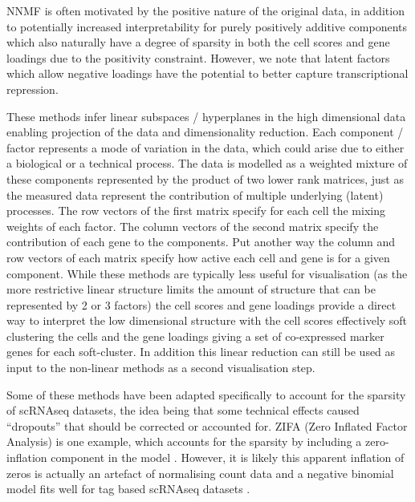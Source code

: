 
NNMF is often motivated by the positive nature of the original data, in addition to potentially increased interpretability for purely positively additive components which also naturally have a degree of sparsity in both the cell scores and gene loadings due to the positivity constraint. However, we note that latent factors which allow negative loadings have the potential to better capture transcriptional repression. 

These methods infer linear subspaces / hyperplanes in the high dimensional data enabling projection of the data and dimensionality reduction. Each component / factor represents a mode of variation in the data, which could arise due to either a biological or a technical process. The data is modelled as a weighted mixture of these components represented by the product of two lower rank matrices, just as the measured data represent the contribution of multiple underlying (latent) processes. The row vectors of the first matrix specify for each cell the mixing weights of each factor. The column vectors of the second matrix specify the contribution of each gene to the components. Put another way the column and row vectors of each matrix specify how active each cell and gene is for a given component. While these methods are typically less useful for visualisation (as the more restrictive linear structure limits the amount of structure that can be represented by 2 or 3 factors) the cell scores and gene loadings provide a direct way to interpret the low dimensional structure with the cell scores effectively soft clustering the cells and the gene loadings giving a set of co-expressed marker genes for each soft-cluster. In addition this linear reduction can still be used as input to the non-linear methods as a second visualisation step.


Some of these methods have been adapted specifically to account for the sparsity of scRNAseq datasets, the idea being that some technical effects caused ``dropouts'' that should be corrected or accounted for. ZIFA (Zero Inflated Factor Analysis) is one example, which accounts for the sparsity by including a zero-inflation component in the model \parencite{Pierson2015ZIFA}. However, it is likely this apparent inflation of zeros is actually an artefact of normalising count data and a negative binomial model fits well for tag based scRNAseq datasets \parencite{Vieth2017powsimR, Svensson2019Droplet, Townes2019Feature}.

